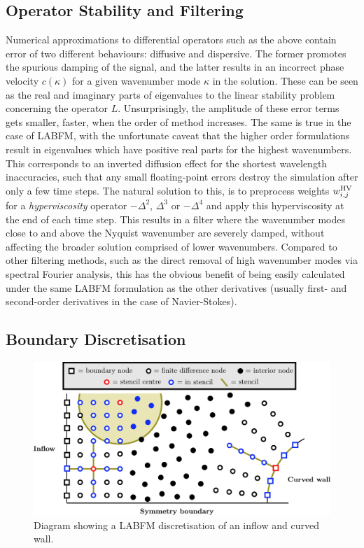 \subsection{Operator Stability and Filtering}

Numerical approximations to differential operators such as the above contain error of two different behaviours: diffusive and dispersive. The former promotes the spurious damping of the signal, and the latter results in an incorrect phase velocity $c(κ)$ for a given wavenumber mode $κ$ in the solution. These can be seen as the real and imaginary parts of eigenvalues to the linear stability problem concerning the operator $L$. Unsurprisingly, the amplitude of these error terms gets smaller, faster, when the order of method increases. The same is true in the case of LABFM, with the unfortunate caveat that the higher order formulations result in eigenvalues which have positive real parts for the highest wavenumbers. This corresponds to an inverted diffusion effect for the shortest wavelength inaccuracies, such that any small floating-point errors destroy the simulation after only a few time steps. The natural solution to this, is to preprocess weights $w^{\rm{HV}}_{i, j}$ for a \emph{hyperviscosity} operator $-Δ^2$, $Δ^3$ or $-Δ^4$ and apply this hyperviscosity at the end of each time step. This results in a filter where the wavenumber modes close to and above the Nyquist wavenumber \cite{nyquist1928CertainTopicsTelegraph} are severely damped, without affecting the broader solution comprised of lower wavenumbers. Compared to other filtering methods, such as the direct removal of high wavenumber modes via spectral Fourier analysis, this has the obvious benefit of being easily calculated under the same LABFM formulation as the other derivatives (usually first- and second-order derivatives in the case of Navier-Stokes).


\subsection{Boundary Discretisation}

\begin{figure}[t]
\centering
\includegraphics[scale=0.60]{assets/imgs/LABFM-boundary-stencils.pdf}
\vspace*{0.5em}
\caption{Diagram showing a LABFM discretisation of an inflow and curved wall.}
\label{fig:labfm-boundary}
\end{figure}


